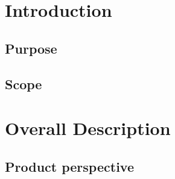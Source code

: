 \documentclass[12pt]{report}
\begin{document}
    
  \begin{titlepage}
    
  \end{titlepage}
  
  \tableofcontents
   
  \chapter{Introduction}
  \section{Purpose}
  
  \section{Scope}
  
  
  \chapter{Overall Description}
  \section{Product perspective}
  
  
\end{document}
